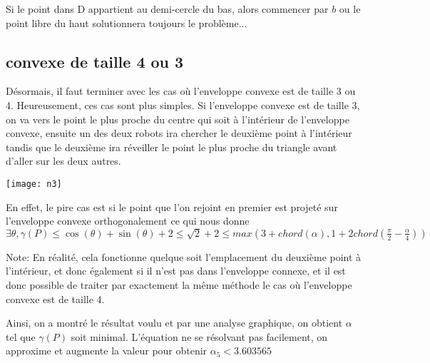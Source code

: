 Si le point dans D appartient au demi-cercle du bas, alors commencer par $b$ ou le point libre du haut solutionnera toujours le problème...

\subsection{convexe de taille 4 ou 3}

Désormais, il faut terminer avec les cas où l'enveloppe convexe est de taille 3 ou 4. Heureusement, ces cas sont plus simples.
Si l'enveloppe convexe est de taille 3, on va vers le point le plus proche du centre qui soit à l'intérieur de l'enveloppe convexe, ensuite un des deux robots ira chercher le deuxième point à l'intérieur tandis que le deuxième ira réveiller le point le plus proche du triangle avant d'aller sur les deux autres.

\texttt{[image: n3]}

En effet, le pire cas est si le point que l'on rejoint en premier est projeté sur l'enveloppe convexe orthogonalement ce qui nous donne $\exists \theta, \gamma(P) \leq \cos(\theta) + \sin(\theta) + 2 \leq \sqrt{2} + 2 \leq max(3 + chord(\alpha), 1 + 2chord(\frac{\pi}{2} - \frac{\alpha}{4}))$

Note: En réalité, cela fonctionne quelque soit l'emplacement du deuxième point à l'intérieur, et donc également si il n'est pas dans l'enveloppe connexe, et il est donc possible de traiter par exactement la même méthode le cas où l'enveloppe convexe est de taille 4.

Ainsi, on a montré le résultat voulu et par une analyse graphique, on obtient $\alpha$ tel que $\gamma(P)$ soit minimal. L'équation ne se résolvant pas facilement, on approxime et augmente la valeur pour obtenir \(\alpha_5 < 3.603565\)